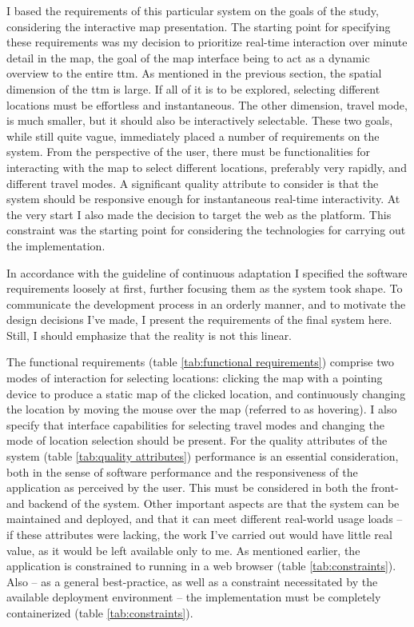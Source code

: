 I based the requirements of this particular system on the goals of the study,
considering the interactive map presentation.
The starting point for specifying these requirements
was my decision to prioritize real-time interaction over minute detail in the map,
the goal of the map interface being to act as a dynamic overview to the entire \acrshort{ttm}.
As mentioned in the previous section,
the spatial dimension of the \acrshort{ttm} is large.
If all of it is to be explored,
selecting different locations must be effortless and instantaneous.
The other dimension, travel mode, is much smaller,
but it should also be interactively selectable.
These two goals, while still quite vague,
immediately placed a number of requirements on the system.
From the perspective of the user,
there must be functionalities for interacting with the map to
select different locations, preferably very rapidly,
and different travel modes.
A significant quality attribute to consider is that the system should
be responsive enough for instantaneous real-time interactivity.
At the very start I also made the decision to target the web as the platform.
This constraint was the starting point for considering the technologies
for carrying out the implementation.

In accordance with the guideline of continuous adaptation
\parencite{bec2001} I specified the software requirements loosely at first,
further focusing them as the system took shape.
To communicate the development process in an orderly manner,
and to motivate the design decisions I've made, I present
the requirements of the final system here.
Still, I should emphasize that the reality is not this linear.

The functional requirements (table \ref{tab:functional requirements})
comprise two modes of interaction for selecting locations:
clicking the map with a pointing device to produce a static map of the clicked location,
and continuously changing the location by moving the mouse over the map
(referred to as hovering).
I also specify that interface capabilities for selecting travel modes
and changing the mode of location selection should be present.
For the quality attributes of the system (table \ref{tab:quality attributes})
performance is an essential consideration,
both in the sense of software performance
and the responsiveness of the application as perceived by the user.
This must be considered in both the front- and backend of the system.
Other important aspects are that the system can be maintained and deployed,
and that it can meet different real-world usage loads --
if these attributes were lacking,
the work I've carried out would have little real value,
as it would be left available only to me.
As mentioned earlier,
the application is constrained to running in a web browser (table \ref{tab:constraints}).
Also -- as a general best-practice, as well as a constraint
necessitated by the available deployment environment --  %
the implementation must be completely containerized (table \ref{tab:constraints}).

